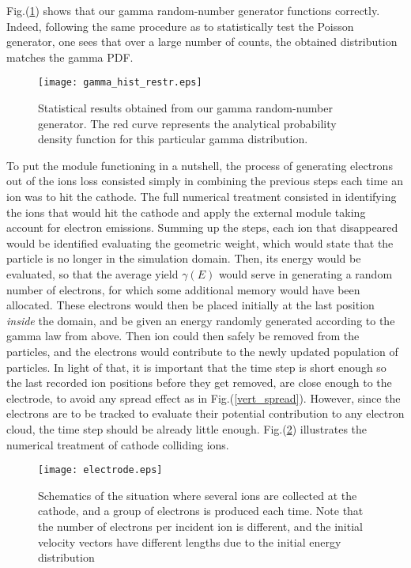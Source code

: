 \noindent Fig.(\ref{gamma_hist}) shows that our gamma random-number generator functions correctly. Indeed, following the same procedure as to statistically test the Poisson generator, one sees that over a large number of counts, the obtained distribution matches the gamma PDF. 

\begin{figure}[h!]
\centering
	\texttt{[image: gamma\_hist\_restr.eps]}
	\caption{\label{gamma_hist} Statistical results obtained from our gamma random-number generator. The red curve represents the analytical probability density function for this particular gamma distribution. }
\end{figure}  



To put the module functioning in a nutshell, the process of generating electrons out of the ions loss consisted simply in combining the previous steps each time an ion was to hit the cathode. The full numerical treatment consisted in identifying the ions that would hit the cathode and apply the external module taking account for electron emissions. Summing up the steps, each ion that disappeared would be identified evaluating the geometric weight, which would state that the particle is no longer in the simulation domain. Then, its energy would be evaluated, so that the average yield $\gamma(E)$ would serve in generating a random number of electrons, for which some additional memory would have been allocated. These electrons would then be placed initially at the last position \emph{inside} the domain, and be given an energy randomly generated according to the gamma law from above. Then ion could then safely be removed from the particles, and the electrons would contribute to the newly updated population of particles. In light of that, it is important that the time step is short enough so the last recorded ion positions before they get removed, are close enough to the electrode, to avoid any spread effect as in Fig.(\ref{vert_spread}). However, since the electrons are to be tracked to evaluate their potential contribution to any electron cloud, the time step should be already little enough. Fig.(\ref{scheme}) illustrates the numerical treatment of cathode colliding ions. 

\begin{figure}[h!]
\centering
	\texttt{[image: electrode.eps]}
	\caption{\label{scheme} Schematics of the situation where several ions are collected at the cathode, and a group of electrons is produced each time. Note that the number of electrons per incident ion is different, and the initial velocity vectors have different lengths due to the initial energy distribution}
\end{figure}  




